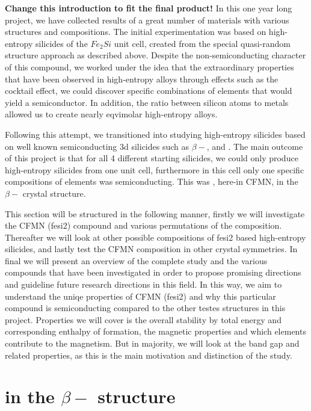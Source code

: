 \textbf{Change this introduction to fit the final product!}
In this one year long project, we have collected results of a great number of materials with various structures and compositions. The initial experimentation was based on high-entropy silicides of the $Fe_2Si$ unit cell, created from the special quasi-random structure approach as described above. Despite the non-semiconducting character of this compound, we worked under the idea that the extraordinary properties that have been observed in high-entropy alloys through effects such as the cocktail effect, we could discover specific combinations of elements that would yield a semiconductor. In addition, the ratio between silicon atoms to metals allowed us to create nearly eqvimolar high-entropy alloys. 

Following this attempt, we transitioned into studying high-entropy silicides based on well known semiconducting 3d silicides such as $\beta-$,  and . The main outcome of this project is that for all 4 different starting silicides, we could only produce high-entropy silicides from one unit cell, furthermore in this cell only one specific compositions of elements was semiconducting. This was , here-in CFMN, in the $\beta-$  crystal structure.  

This section will be structured in the following manner, firstly we will investigate the CFMN (fesi2) compound and various permutations of the composition. Thereafter we will look at other possible compositions of fesi2 based high-entropy silicides, and lastly test the CFMN composition in other crystal symmetries. In final we will present an overview of the complete study and the various compounds that have been investigated in order to propose promising directions and guideline future research directions in this field. In this way, we aim to understand the uniqe properties of CFMN (fesi2) and why this particular compound is semiconducting compared to the other testes structures in this project. Properties we will cover is the overall stability by total energy and corresponding enthalpy of formation, the magnetic properties and which elements contribute to the magnetism. But in majority, we will look at the band gap and related properties, as this is the main motivation and distinction of the study.


\chapter{ in the $\beta-$ structure}
\label{sec:equi}

